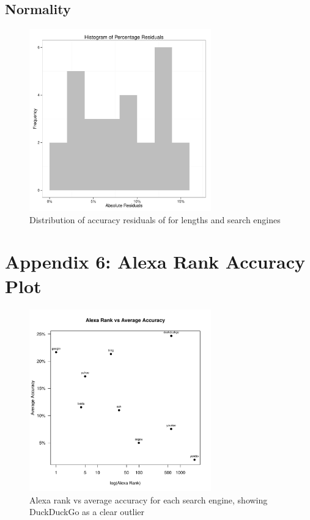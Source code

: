 \documentclass{csfourzero}
\begin{document}
\subsection{Normality}
\begin{figure}[H]
  \centerline{\includegraphics[width=0.7\textwidth]{residual_histogram}}
  \caption{Distribution of accuracy residuals of for lengths and search engines}\label{fig:9searchengines}
\end{figure}

\pagebreak
\section{Appendix 6: Alexa Rank Accuracy Plot}
\begin{figure}[H]
  \centerline{\includegraphics[width=0.7\textwidth]{rank_scatter}}
  \caption{Alexa rank vs average accuracy for each search engine, showing DuckDuckGo as a clear outlier}\label{fig:9searchengines}
\end{figure}
\end{document}

